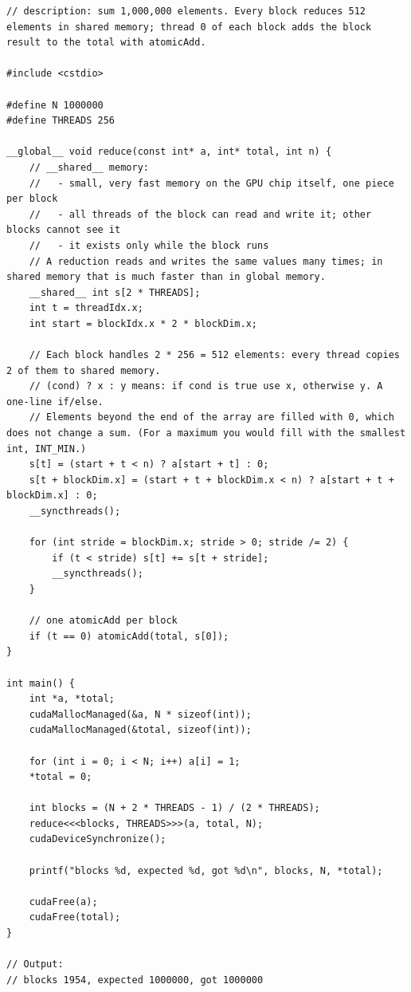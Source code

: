 \documentclass[main.tex]{subfiles}
\begin{document}
\begin{lstlisting}[language=CUDA]
// description: sum 1,000,000 elements. Every block reduces 512 elements in shared memory; thread 0 of each block adds the block result to the total with atomicAdd.

#include <cstdio>

#define N 1000000
#define THREADS 256

__global__ void reduce(const int* a, int* total, int n) {
    // __shared__ memory:
    //   - small, very fast memory on the GPU chip itself, one piece per block
    //   - all threads of the block can read and write it; other blocks cannot see it
    //   - it exists only while the block runs
    // A reduction reads and writes the same values many times; in shared memory that is much faster than in global memory.
    __shared__ int s[2 * THREADS];
    int t = threadIdx.x;
    int start = blockIdx.x * 2 * blockDim.x;

    // Each block handles 2 * 256 = 512 elements: every thread copies 2 of them to shared memory.
    // (cond) ? x : y means: if cond is true use x, otherwise y. A one-line if/else.
    // Elements beyond the end of the array are filled with 0, which does not change a sum. (For a maximum you would fill with the smallest int, INT_MIN.)
    s[t] = (start + t < n) ? a[start + t] : 0;
    s[t + blockDim.x] = (start + t + blockDim.x < n) ? a[start + t + blockDim.x] : 0;
    __syncthreads();

    for (int stride = blockDim.x; stride > 0; stride /= 2) {
        if (t < stride) s[t] += s[t + stride];
        __syncthreads();
    }

    // one atomicAdd per block
    if (t == 0) atomicAdd(total, s[0]);
}

int main() {
    int *a, *total;
    cudaMallocManaged(&a, N * sizeof(int));
    cudaMallocManaged(&total, sizeof(int));

    for (int i = 0; i < N; i++) a[i] = 1;
    *total = 0;

    int blocks = (N + 2 * THREADS - 1) / (2 * THREADS);
    reduce<<<blocks, THREADS>>>(a, total, N);
    cudaDeviceSynchronize();

    printf("blocks %d, expected %d, got %d\n", blocks, N, *total);

    cudaFree(a);
    cudaFree(total);
}

// Output:
// blocks 1954, expected 1000000, got 1000000
\end{lstlisting}

\end{document}
